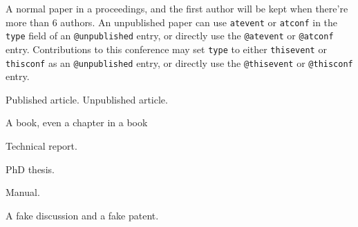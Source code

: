 \documentclass{article}
\begin{document}
A normal paper in a proceedings\cite{klaproth:ipac2022-mopopt018}, and the first author will be kept when there're more than 6 authors\cite{funakoshi:ipac2022-moplxgd1}. An unpublished paper can use \verb|atevent| or \verb|atconf| in the \verb|type| field of an \verb|@unpublished| entry\cite{lin:ipac2022-moiygd2}, or directly use the \verb|@atevent| or \verb|@atconf| entry\cite{loisch:ipac2022-mooygd1}. Contributions to this conference may set \verb|type| to either \verb|thisevent| or \verb|thisconf| as an \verb|@unpublished| entry\cite{cook:ipac2022-mopopt067}, or directly use the \verb|@thisevent| or \verb|@thisconf| entry\cite{edelen:ipac2022-moiysp1}.

Published article\cite{baker:nature-533-452,PhysRevSTAB.17.112801,PhysRevSTAB.17.112803}. Unpublished article\cite{chen:arxiv:1309.2353,author:fake-paper,author:fake-unfinished-paper}.

A book\cite{wiedemann:particle-accelerator-physics}, even a chapter in a book\cite{forest:beam-dynamics:ch3}

Technical report\cite{herr:cern-2014-009.157}.

PhD thesis\cite{fol:cern-thesis-2021-261}.

Manual\cite{ieee-style}.

A fake discussion\cite{fake-discussion} and a fake patent\cite{fake-patent}.

\printbibliography
\end{document}
